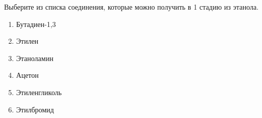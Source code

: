 
Выберите из списка
соединения, которые можно получить в 1 стадию из этанола.

\begin{enumerate}
    \item Бутадиен-1,3
    \item Этилен
    \item Этаноламин
    \item Ацетон
    \item Этиленгликоль
    \item Этилбромид
\end{enumerate}



